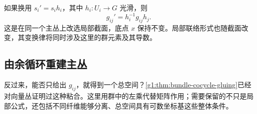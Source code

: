 \ProseParagraphBreak

如果换用 \(s_i'=s_i h_i\)，其中 \(h_i:U_i\to G\) 光滑，则
\begin{equation}\label{g1:eq:principal-transition-change}
	g_{ij}'=h_i^{-1}g_{ij}h_j.
\end{equation}
这是在同一个主丛上改选局部截面，底点 \(x\) 保持不变。局部联络形式也随截面改变，其变换律将同时涉及这里的群元素及其导数。

\subsection{由余循环重建主丛}
\label{g1:subsec:1801:02}

反过来，能否只给出 \(g_{ij}\)，就得到一个总空间？\cref{g1:thm:bundle-cocycle-gluing}已经对向量丛证明过这种粘合。这里用群中的左乘代替矩阵作用；需要保留的不只是局部公式，还包括不同纤维能够分离、总空间具有可数坐标基这些整体条件。


